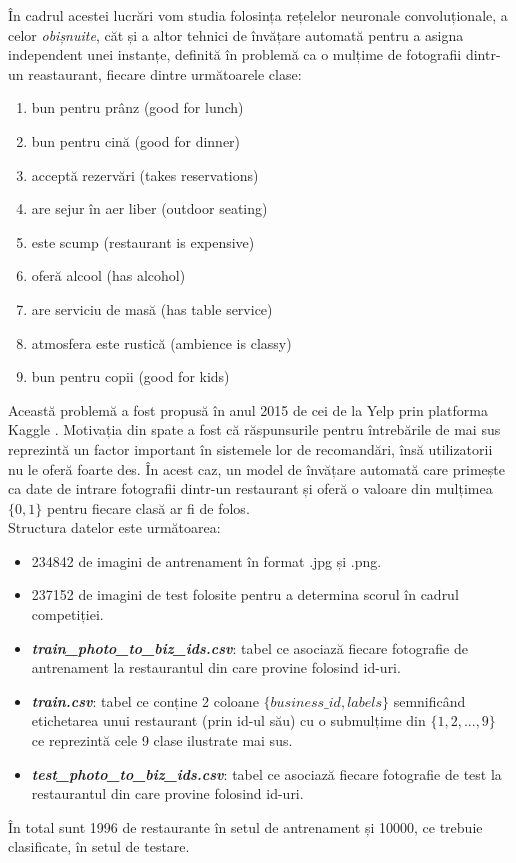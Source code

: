 În cadrul acestei lucrări vom studia folosința rețelelor neuronale convoluționale, a celor \textit{obișnuite}, căt și a altor tehnici de învățare automată pentru a asigna independent unei instanțe, definită în problemă ca o mulțime de fotografii dintr-un reastaurant, fiecare dintre următoarele clase:\\

\begin{enumerate}
\item bun pentru prânz (good for lunch)
\item bun pentru cină (good for dinner)
\item acceptă rezervări (takes reservations)
\item are sejur în aer liber (outdoor seating)
\item este scump (restaurant is expensive)
\item oferă alcool (has alcohol)
\item are serviciu de masă (has table service)
\item atmosfera este rustică (ambience is classy)
\item bun pentru copii (good for kids)
\end{enumerate}

Această problemă a fost propusă în anul 2015 de cei de la Yelp prin platforma Kaggle \cite{competition}. Motivația din spate a fost că răspunsurile pentru întrebările de mai sus reprezintă un factor important în sistemele lor de recomandări, însă utilizatorii nu le oferă foarte des. În acest caz, un model de învățare automată care primește ca date de intrare fotografii dintr-un restaurant și oferă o valoare din mulțimea $\{0, 1\}$ pentru fiecare clasă ar fi de folos.\\

Structura datelor este următoarea:

\begin{itemize}
\item 234842 de imagini de antrenament în format .jpg și .png.
\item 237152 de imagini de test folosite pentru a determina scorul în cadrul competiției.
\item \textit{\textbf{train\_photo\_to\_biz\_ids.csv}}: tabel ce asociază fiecare fotografie de antrenament la restaurantul din care provine folosind id-uri.
\item \textit{\textbf{train.csv}}: tabel ce conține 2 coloane $\{business\_id, labels\}$ semnificând etichetarea unui restaurant (prin id-ul său) cu o submulțime din $\{1,2,...,9\}$ ce reprezintă cele 9 clase ilustrate mai sus.
\item \textit{\textbf{test\_photo\_to\_biz\_ids.csv}}: tabel ce asociază fiecare fotografie de test la restaurantul din care provine folosind id-uri.
\end{itemize}

În total sunt 1996 de restaurante în setul de antrenament și 10000, ce trebuie clasificate, în setul de testare.